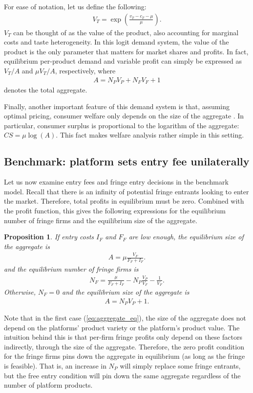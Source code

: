 \documentclass[a4paper]{article}
\newtheorem{proposition}{Proposition}
\begin{document}
For ease of notation, let us define the following:
\begin{align*}
    V_T = \exp \left( \frac{v_T - c_T - \mu}{\mu} \right).
\end{align*}
$V_T$ can be thought of as the value of the product, also accounting for marginal costs and taste heterogeneity.
In this logit demand system, the value of the product is the only parameter that matters for market shares and profits.
In fact, equilibrium per-product demand and variable profit can simply be expressed as $V_T/ A$ and $\mu V_T/ A$, respectively, where
\begin{align*}
    A = N_P V_P + N_F V_F + 1
\end{align*}
denotes the total aggregate.

Finally, another important feature of this demand system is that, assuming optimal pricing, consumer welfare only depends on the size of the aggregate \parencite{anderson2020aggregative}.
In particular, consumer surplus is proportional to the logarithm of the aggregate: $CS = \mu \log(A)$. This fact makes welfare analysis rather simple in this setting.

\subsection{Benchmark: platform sets entry fee unilaterally}

Let us now examine entry fees and fringe entry decisions in the benchmark model.
Recall that there is an infinity of potential fringe entrants looking to enter the market.
Therefore, total profits in equilibrium must be zero.
Combined with the  profit function, this gives the following expressions for the equilibrium number of fringe firms and the equilibrium size of the aggregate.
\begin{proposition}
    \label{prop:equilibrium_aggregate}
    If entry costs $I_F$ and $F_F$ are low enough, the equilibrium size of the aggregate is
    \begin{align}
        A = \mu \frac{V_F}{F_F + I_F}.
        \label{eq:aggregate_eq}
    \end{align}
    and the equilibrium number of fringe firms is
    \begin{align*}
        N_F = \frac{\mu}{F_F + I_F} - N_P \frac{V_P}{V_F} - \frac{1}{V_F}.
    \end{align*}
    Otherwise,  $N_F = 0$ and the equilibrium size of the aggregate is
    \begin{align*}
        A = N_P V_P + 1.
    \end{align*}
\end{proposition}
Note that in the first case (\cref{eq:aggregate_eq}), the size of the aggregate does not depend on the platforms' product variety or the platform's product value.
The intuition behind this is that per-firm fringe profits only depend on these factors indirectly, through the size of the aggregate.
Therefore, the zero profit condition for the fringe firms pins down the aggregate in equilibrium (as long as the fringe is feasible).
That is, an increase in $N_P$ will simply replace some fringe entrants, but the free entry condition will pin down the same aggregate regardless of the number of platform products.
\end{document}
